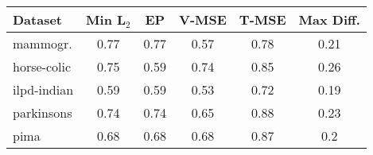 \begin{table}[t]
	\centering
	\label{table:tuning-small}
	\begin{tabular}{lccccc} \toprule
		\textbf{Dataset} & \textbf{Min L$_2$} & \textbf{EP} & \textbf{V-MSE} & \textbf{T-MSE} & \textbf{Max Diff.} \\
		\midrule
		mammogr.         & 0.77               & 0.77        & 0.57           & 0.78           & 0.21               \\
		horse-colic      & 0.75               & 0.59        & 0.74           & 0.85           & 0.26               \\
		ilpd-indian      & 0.59               & 0.59        & 0.53           & 0.72           & 0.19               \\
		parkinsons       & 0.74               & 0.74        & 0.65           & 0.88           & 0.23               \\
		pima             & 0.68               & 0.68        & 0.68           & 0.87           & 0.2                \\
		\bottomrule
	\end{tabular}
\end{table}

